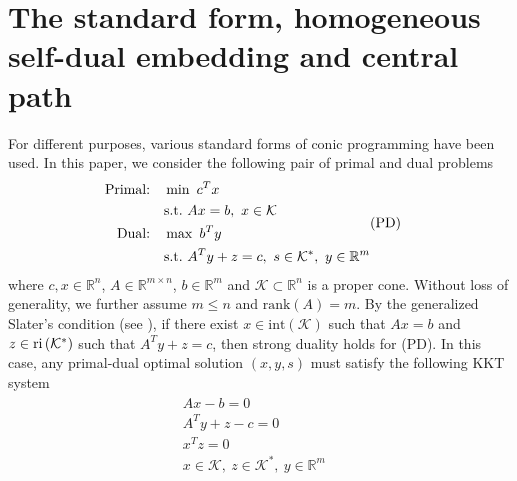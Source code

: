 \documentclass[10pt]{article}
\theoremstyle{definition}
\theoremstyle{plain}
\def\interior{\protect{\textnormal{ri}}}
\begin{document}
\section{The standard form, homogeneous self-dual embedding and central path}
For different purposes, various standard forms of conic programming have been used. In this paper, we consider the following pair of primal and dual problems
\begin{align}
\begin{split} 
\text{Primal:} \quad &\min\,\, c^Tx\\ 
&\textnormal{s.t.} \,\, Ax=b,\ x\in \mathcal{K} \\
\text{Dual:}  \quad &\max\,\, b^Ty \\
&\textnormal{s.t.} \,\, A^Ty+z=c,\ s\in\mathcal{K}^*,\ y \in \mathbb{R}^m \\
\end{split} &\text{(PD)} \nonumber
\end{align}
where $c,x \in \mathbb{R}^n$, $A\in \mathbb{R}^{m\times n}$, $b\in \mathbb{R}^m$ and $\mathcal{K} \subset \mathbb{R}^n$ is a proper cone. Without loss of generality, we further assume $m\leq n$ and $\text{rank}(A) = m$. By the generalized Slater's condition (see \cite{Boyd_Vander_Convex_Opt_Book}), if there exist
$x \in \text{int} \left(\mathcal{K}\right)$ such that $Ax=b$ and $z \in \interior \left(\mathcal{K}^*\right)$ such that $A^Ty+z=c$,
then strong duality holds for (PD). In this case, any primal-dual optimal solution $(x,y,s)$ must satisfy the following KKT system
\begin{align}\label{KKT_for_PD}
\begin{split}
Ax-b=0& \\
A^Ty+z-c=0& \\
x^Tz=0& \\
x\in\mathcal{K},\ z\in \mathcal{K}^*,\ y\in\mathbb{R}^m& 
\end{split}
\end{align}
\end{document}
